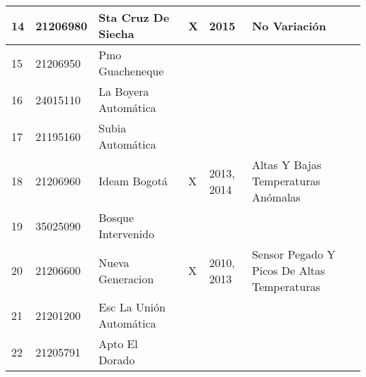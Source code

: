 \begin{table}[H]
\begin{tabular}{lllp{2cm}lp{3cm}}
14 & 21206980 & Sta Cruz De Siecha      & X                 & 2015        & No Variación                                \\ \hline
15 & 21206950 & Pmo Guacheneque         &                   &             &                                             \\ \hline
16 & 24015110 & La Boyera Automática    &                   &             &                                             \\ \hline
17 & 21195160 & Subia Automática        &                   &             &                                             \\ \hline
18 & 21206960 & Ideam Bogotá            & X                 & 2013, 2014  & Altas Y Bajas Temperaturas Anómalas         \\ \hline
19 & 35025090 & Bosque Intervenido      &                   &             &                                             \\ \hline
20 & 21206600 & Nueva Generacion        & X                 & 2010, 2013  & Sensor Pegado Y Picos De Altas Temperaturas \\ \hline
21 & 21201200 & Esc La Unión Automática &                   &             &                                             \\ \hline
22 & 21205791 & Apto El Dorado          &                   &             &                                            
\end{tabular}
\end{table}
